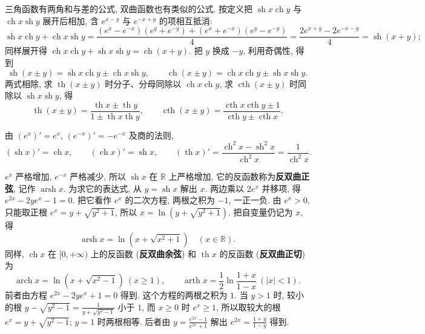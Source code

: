 \documentclass[UTF8,openany]{ctexbook}
\theoremstyle{chinesetextbook}
\begin{document}
三角函数有两角和与差的公式, 双曲函数也有类似的公式. 按定义把 $\operatorname{sh}x\operatorname{ch}y$ 与 $\operatorname{ch}x\operatorname{sh}y$ 展开后相加, 含 $e^{x-y}$ 与 $e^{-x+y}$ 的项相互抵消:
\[
\operatorname{sh}x\operatorname{ch}y+\operatorname{ch}x\operatorname{sh}y=\frac{(e^x-e^{-x})(e^y+e^{-y})+(e^x+e^{-x})(e^y-e^{-y})}4=\frac{2e^{x+y}-2e^{-x-y}}4=\operatorname{sh}(x+y);
\]
同样展开得 $\operatorname{ch}x\operatorname{ch}y+\operatorname{sh}x\operatorname{sh}y=\operatorname{ch}(x+y)$. 把 $y$ 换成 $-y$, 利用奇偶性, 得到
\[
\operatorname{sh}(x\pm y)=\operatorname{sh}x\operatorname{ch}y\pm\operatorname{ch}x\operatorname{sh}y,\qquad\operatorname{ch}(x\pm y)=\operatorname{ch}x\operatorname{ch}y\pm\operatorname{sh}x\operatorname{sh}y.
\]
两式相除, 求 $\operatorname{th}(x\pm y)$ 时分子、分母同除以 $\operatorname{ch}x\operatorname{ch}y$, 求 $\operatorname{cth}(x\pm y)$ 时同除以 $\operatorname{sh}x\operatorname{sh}y$, 得
\[
\operatorname{th}(x\pm y)=\frac{\operatorname{th}x\pm\operatorname{th}y}{1\pm\operatorname{th}x\operatorname{th}y},\qquad\operatorname{cth}(x\pm y)=\frac{\operatorname{cth}x\operatorname{cth}y\pm1}{\operatorname{cth}y\pm\operatorname{cth}x}.
\]

由 $(e^x)'=e^x$, $(e^{-x})'=-e^{-x}$ 及商的法则,
\[
(\operatorname{sh}x)'=\operatorname{ch}x,\qquad(\operatorname{ch}x)'=\operatorname{sh}x,\qquad(\operatorname{th}x)'=\frac{\operatorname{ch}^2x-\operatorname{sh}^2x}{\operatorname{ch}^2x}=\frac1{\operatorname{ch}^2x}.
\]

$e^x$ 严格增加, $e^{-x}$ 严格减少, 所以 $\operatorname{sh}x$ 在 $\mathbb R$ 上严格增加, 它的反函数称为\textbf{反双曲正弦}, 记作 $\operatorname{arsh}x$. 为求它的表达式, 从 $y=\operatorname{sh}x$ 解出 $x$. 两边乘以 $2e^x$ 并移项, 得 $e^{2x}-2ye^x-1=0$. 把它看作 $e^x$ 的二次方程, 两根之积为 $-1$, 一正一负. 由 $e^x>0$, 只能取正根 $e^x=y+\sqrt{y^2+1}$, 所以 $x=\ln\left(y+\sqrt{y^2+1}\right)$. 把自变量仍记为 $x$, 得
\[
\operatorname{arsh}x=\ln\left(x+\sqrt{x^2+1}\right)\quad(x\in\mathbb R).
\]
同样, $\operatorname{ch}x$ 在 $[0,+\infty)$ 上的反函数 (\textbf{反双曲余弦}) 和 $\operatorname{th}x$ 的反函数 (\textbf{反双曲正切}) 为
\[
\operatorname{arch}x=\ln\left(x+\sqrt{x^2-1}\right)\ (x\ge1),\qquad\operatorname{arth}x=\frac12\ln\frac{1+x}{1-x}\ (|x|<1).
\]
前者由方程 $e^{2x}-2ye^x+1=0$ 得到. 这个方程的两根之积为 $1$. 当 $y>1$ 时, 较小的根 $\displaystyle y-\sqrt{y^2-1}=\frac1{y+\sqrt{y^2-1}}$ 小于 $1$, 而 $x\ge0$ 时 $e^x\ge1$, 所以取较大的根 $e^x=y+\sqrt{y^2-1}$; $y=1$ 时两根相等. 后者由 $\displaystyle y=\frac{e^{2x}-1}{e^{2x}+1}$ 解出 $\displaystyle e^{2x}=\frac{1+y}{1-y}$ 得到.
\end{document}
